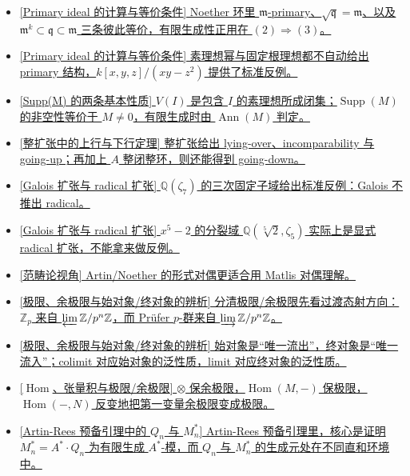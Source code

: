 \documentclass[a4paper]{ctexart}
\theoremstyle{definition}
\theoremstyle{analysis}
\theoremstyle{plain}
\begin{document}
\begin{itemize}
  \item \hyperref[rem:m-primary]{[\hyperref[subsec:primary-ideal-colon]{Primary ideal 的计算与等价条件}] Noether 环里 \(\mathfrak m\)-primary、\(\sqrt{\mathfrak q}=\mathfrak m\)、以及 \(\mathfrak m^k\subset \mathfrak q\subset \mathfrak m\) 三条彼此等价，有限生成性正用在 \((2)\Rightarrow(3)\)。}
  \item \hyperref[rem:primary-counterexample]{[\hyperref[subsec:primary-ideal-colon]{Primary ideal 的计算与等价条件}] 素理想幂与固定根理想都不自动给出 primary 结构，\(k[x,y,z]/(xy-z^2)\) 提供了标准反例。}
  \item \hyperref[rem:support-basic]{[\hyperref[subsec:support-basic]{Supp(M) 的两条基本性质}] \(V(I)\) 是包含 \(I\) 的素理想所成闭集；\(\operatorname{Supp}(M)\) 的非空性等价于 \(M\neq 0\)，有限生成时由 \(\operatorname{Ann}(M)\) 判定。}
  \item \hyperref[rem:going-up-down]{[\hyperref[subsec:going-up-down]{整扩张中的上行与下行定理}] 整扩张给出 lying-over、incomparability 与 going-up；再加上 \(A\) 整闭整环，则还能得到 going-down。}
  \item \hyperref[rem:galois-not-radical]{[\hyperref[subsec:galois-radical]{Galois 扩张与 radical 扩张}] \(\mathbb Q(\zeta_7)\) 的三次固定子域给出标准反例：Galois 不推出 radical。}
  \item \hyperref[rem:x5-splitting-radical]{[\hyperref[subsec:galois-radical]{Galois 扩张与 radical 扩张}] \(x^5-2\) 的分裂域 \(\mathbb Q(\sqrt[5]{2},\zeta_5)\) 实际上是显式 radical 扩张，不能拿来做反例。}
  \item \hyperref[subsec:categorical-view]{[范畴论视角] Artin/Noether 的形式对偶更适合用 Matlis 对偶理解。}
  \item \hyperref[rem:limits-colimits-padic]{[\hyperref[subsec:limits-colimits]{极限、余极限与始对象/终对象的辨析}] 分清极限/余极限先看过渡态射方向：\(\mathbb Z_p\) 来自 \(\varprojlim \mathbb Z/p^n\mathbb Z\)，而 Prüfer \(p\)-群来自 \(\varinjlim \mathbb Z/p^n\mathbb Z\)。}
  \item \hyperref[rem:initial-terminal-limits]{[\hyperref[subsec:limits-colimits]{极限、余极限与始对象/终对象的辨析}] 始对象是“唯一流出”，终对象是“唯一流入”；colimit 对应始对象的泛性质，limit 对应终对象的泛性质。}
  \item \hyperref[rem:hom-tensor-limits]{[\hyperref[subsec:hom-tensor-limits]{\(\operatorname{Hom}\)、张量积与极限/余极限}] \(\otimes\) 保余极限，\(\operatorname{Hom}(M,-)\) 保极限，\(\operatorname{Hom}(-,N)\) 反变地把第一变量余极限变成极限。}
  \item \hyperref[subsec:artin-rees-qn]{[Artin-Rees 预备引理中的 \(Q_n\) 与 \(M_n^*\)] Artin-Rees 预备引理里，核心是证明 \(M_n^*=A^*\!\cdot Q_n\) 为有限生成 \(A^*\)-模，而 \(Q_n\) 与 \(M_n^*\) 的生成元处在不同直和环境中。}

\end{itemize}
\end{document}

